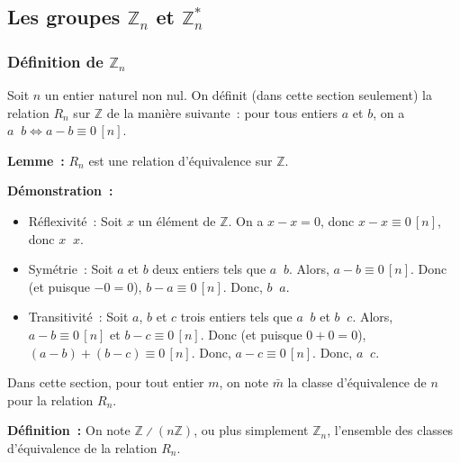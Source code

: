 \subsection{Les groupes \texorpdfstring{$\mathbb{Z}_n$}{Zn} et \texorpdfstring{$\mathbb{Z}_n^*$}{Zn*}}

\subsubsection{Définition de \texorpdfstring{$\mathbb{Z}_n$}{Zn}}

Soit $n$ un entier naturel non nul. 
On définit (dans cette section seulement) la relation $R_n$ sur $\mathbb{Z}$ de la manière suivante : pour tous entiers $a$ et $b$, on a $a \mathop{R_n} b \Leftrightarrow a - b \equiv 0 \, [n]$.

\medskip

\noindent\textbf{Lemme :} $R_n$ est une relation d'équivalence sur $\mathbb{Z}$. 

\medskip

\noindent\textbf{Démonstration :} 
\begin{itemize}[nosep]
    \item Réflexivité : Soit $x$ un élément de $\mathbb{Z}$. 
        On a $x - x = 0$, donc $x - x \equiv 0 \, [n]$, donc $x \mathop{R_n} x$.
    \item Symétrie : Soit $a$ et $b$ deux entiers tels que $a \mathop{R_n} b$.
        Alors, $a - b \equiv 0 \, [n]$.
        Donc (et puisque $-0 = 0$), $b - a \equiv 0 \, [n]$.
        Donc, $b \mathop{R_n} a$.
    \item Transitivité : Soit $a$, $b$ et $c$ trois entiers tels que $a \mathop{R_n} b$ et $b \mathop{R_n} c$.
        Alors, $a - b \equiv 0 \, [n]$ et $b - c \equiv 0 \, [n]$.
        Donc (et puisque $0 + 0 = 0$), $(a - b) + (b - c) \equiv 0 \, [n]$.
        Donc, $a - c \equiv 0 \, [n]$.
        Donc, $a \mathop{R_n} c$.
\end{itemize}

\done

\medskip

Dans cette section, pour tout entier $m$, on note $\bar{m}$ la classe d'équivalence de $n$ pour la relation $R_n$.

\medskip

\noindent\textbf{Définition :} On note $\mathbb{Z} \divslash (n \mathbb{Z})$, ou plus simplement $\mathbb{Z}_n$, l'ensemble des classes d'équivalence de la relation $R_n$.

\medskip

